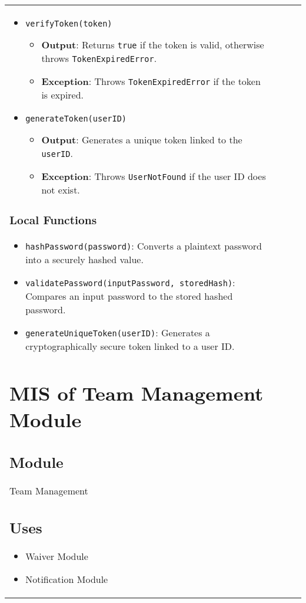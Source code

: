 \documentclass[12pt, titlepage]{article}
\begin{document}
\begin{itemize}
\begin{center}
\begin{tabular}{|p{3cm}|p{4cm}|p{4cm}|p{4cm}|}
\begin{itemize}
\begin{itemize}
    \item \texttt{verifyToken(token)}
    \begin{itemize}
        \item \textbf{Output}: Returns \texttt{true} if the token is valid, otherwise throws \texttt{TokenExpiredError}.
        \item \textbf{Exception}: Throws \texttt{TokenExpiredError} if the token is expired.
    \end{itemize}

    \item \texttt{generateToken(userID)}
    \begin{itemize}
        \item \textbf{Output}: Generates a unique token linked to the \texttt{userID}.
        \item \textbf{Exception}: Throws \texttt{UserNotFound} if the user ID does not exist.
    \end{itemize}
\end{itemize}

\subsubsection{Local Functions}

\begin{itemize}
    \item \texttt{hashPassword(password)}: Converts a plaintext password into a securely hashed value.
    \item \texttt{validatePassword(inputPassword, storedHash)}: Compares an input password to the stored hashed password.
    \item \texttt{generateUniqueToken(userID)}: Generates a cryptographically secure token linked to a user ID.
\end{itemize}

\section{MIS of Team Management Module} \label{TeamManagementModule}

\subsection{Module}
Team Management

\subsection{Uses}
\begin{itemize}
    \item Waiver Module
    \item Notification Module
\end{itemize}


\end{itemize}
\end{tabular}
\end{center}
\end{itemize}
\end{document}
